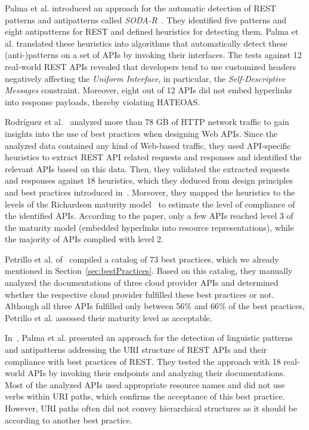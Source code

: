 \documentclass[runningheads]{llncs}
\begin{document}
Palma et al. introduced an approach for the automatic detection of REST patterns and antipatterns called \textit{SODA-R}~\cite{article:DetectionOfRESTPatternsAndAntipatterns}. They identified five patterns and eight antipatterns for REST and defined heuristics for detecting them. Palma et al. translated these heuristics into algorithms that automatically detect these (anti-)patterns on a set of APIs by invoking their interfaces. The tests against 12 real-world REST APIs revealed that developers tend to use customized headers negatively affecting the \textit{Uniform Interface}, in particular, the \textit{Self-Descriptive Messages} constraint. Moreover, eight out of 12 APIs did not embed hyperlinks into response payloads, thereby violating HATEOAS.

Rodríguez et al.~\cite{article:Rodriguez2016} analyzed more than 78 GB of HTTP network traffic to gain insights into the use of best practices when designing Web APIs. Since the analyzed data contained any kind of Web-based traffic, they used API-specific heuristics to extract REST API related requests and responses and identified the relevant APIs based on this data. Then, they validated the extracted requests and responses against 18 heuristics, which they deduced from design principles and best practices introduced in~\cite{book:RestApiDesignRulebook2011,Palma2015a,Pautasso2014}. Moreover, they mapped the heuristics to the levels of the Richardson maturity model~\cite{web:MaturityModel} to estimate the level of compliance of the identified APIs. According to the paper, only a few APIs reached level 3 of the maturity model (embedded hyperlinks into resource representations), while the majority of APIs complied with level 2.  

Petrillo et al. of~\cite{conference:Petrillo2016} compiled a catalog of 73 best practices, which we already mentioned in Section~\ref{sec:bestPractices}. Based on this catalog, they manually analyzed the documentations of three cloud provider APIs and determined whether the respective cloud provider fulfilled these best practices or not. Although all three APIs fulfilled only between 56\% and 66\% of the best practices, Petrillo et al. assessed their maturity level as acceptable. 

In~\cite{article:Palma2017}, Palma et al. presented an approach for the detection of linguistic patterns and antipatterns addressing the URI structure of REST APIs and their compliance with best practices of REST. They tested the approach with 18 real-world APIs by invoking their endpoints and analyzing their documentations. Most of the analyzed APIs used appropriate resource names and did not use verbs within URI paths, which confirms the acceptance of this best practice. However, URI paths often did not convey hierarchical structures as it should be according to another best practice.
\end{document}
